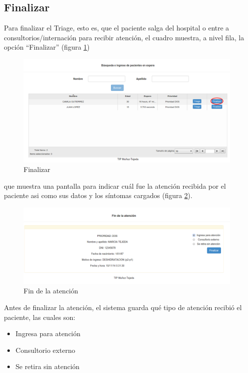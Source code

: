 \subsection{Finalizar}
Para finalizar el Triage, esto es, que el paciente salga del hospital o entre a consultorios/internación para recibir atención, el cuadro muestra, a nivel fila, la opción ``Finalizar'' (figura \ref{fig:espera2})
\begin{figure}
\centerline{\includegraphics[width=0.99\textwidth]{espera2.png}}
\caption{Finalizar} \label{fig:espera2}
\end{figure}
que muestra una pantalla para indicar cuál fue la atención recibida por el paciente asi como sus datos y los síntomas cargados (figura \ref{fig:fin_atencion}).
\begin{figure}
\centerline{\includegraphics[width=0.99\textwidth]{fin_atencion.png}}
\caption{Fin de la atención} \label{fig:fin_atencion}
\end{figure}

Antes de finalizar la atención, el sistema guarda qué tipo de atención recibió el paciente, las cuales son:

\begin{itemize}
\item Ingresa para atención
\item Consultorio externo
\item Se retira sin atención
\end{itemize}